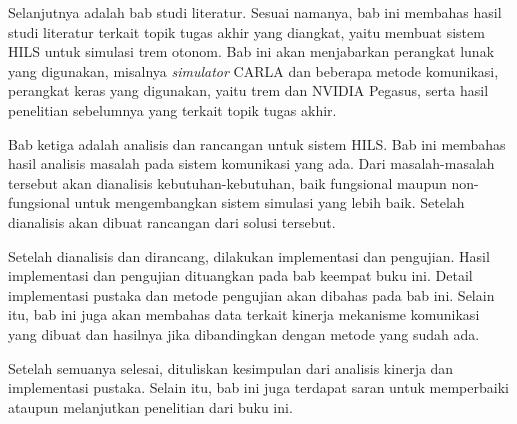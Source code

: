 Selanjutnya adalah bab studi literatur. Sesuai namanya, bab ini membahas hasil
studi literatur terkait topik tugas akhir yang diangkat, yaitu membuat sistem
HILS untuk simulasi trem otonom. Bab ini akan menjabarkan perangkat lunak yang
digunakan, misalnya \textit{simulator} CARLA dan beberapa metode komunikasi,
perangkat keras yang digunakan, yaitu trem dan NVIDIA Pegasus, serta hasil
penelitian sebelumnya yang terkait topik tugas akhir.

Bab ketiga adalah analisis dan rancangan untuk sistem HILS. Bab ini membahas
hasil analisis masalah pada sistem komunikasi yang ada. Dari masalah-masalah
tersebut akan dianalisis kebutuhan-kebutuhan, baik fungsional maupun
non-fungsional untuk mengembangkan sistem simulasi yang lebih baik. Setelah
dianalisis akan dibuat rancangan dari solusi tersebut.

Setelah dianalisis dan dirancang, dilakukan implementasi dan pengujian. Hasil
implementasi dan pengujian dituangkan pada bab keempat buku ini. Detail
implementasi pustaka dan metode pengujian akan dibahas pada bab ini. Selain itu, bab ini juga akan membahas data terkait kinerja mekanisme komunikasi
yang dibuat dan hasilnya jika dibandingkan dengan metode yang sudah ada.

Setelah semuanya selesai, dituliskan kesimpulan dari analisis kinerja dan
implementasi pustaka. Selain itu, bab ini juga terdapat saran untuk memperbaiki
ataupun melanjutkan penelitian dari buku ini.
